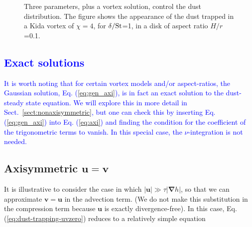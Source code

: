 \documentclass[apj]{emulateapj}
\renewcommand{\v}[1]{{\boldsymbol{#1}}} %
\def\blue#1{\textcolor{blue}{#1}}
\newcommand{\del}{\v{\nabla}}
\newcommand{\grad}{\del}
\newcommand{\Eq}[1]{Eq. (\ref{#1})}
\newcommand{\eq}[1]{\Eq{#1}}
\newcommand{\sect}[1]{Sect.~\ref{#1}}
\newcommand{\St}{{\rm St}}
\begin{document}
\begin{figure}
\begin{center}
 \end{center}
\caption[]{Three parameters, plus a vortex solution, control the dust distribution. 
The figure shows the appearance of the dust trapped in a Kida vortex of $\chi=4$, 
for $\delta/\St$=1, in a disk of aspect ratio $H/r$=0.1.}
 \label{fig:disk}
\end{figure}

\blue{
\subsection{Exact solutions}
It is worth noting that for certain vortex models and/or aspect-ratios, the Gaussian solution, \eq{eq:gen_axi}, is in fact an exact solution to the dust-steady state equation.  We will explore this in more detail  in \sect{sect:nonaxisymmetric}, but one can check this by inserting \eq{eq:gen_axi} into \eq{eq:axi} and finding the condition for the coefficient of the trigonometric terms to vanish. In this special case, the $\nu$-integration is not needed.  
}
\subsection{Axisymmetric $\v{u} = \v{v}$ }
It is illustrative to consider the case in which $|\v{u}| \gg \tau|\grad{h}|$,
so that we can approximate $\v{v}=\v{u}$ in the advection term. (We do
not make this substitution in the compression term because $\v{u}$ is
exactly divergence-free). In this case, \eq{eq:dust-trapping-uvzero} reduces
to a relatively simple equation 
\end{document}
